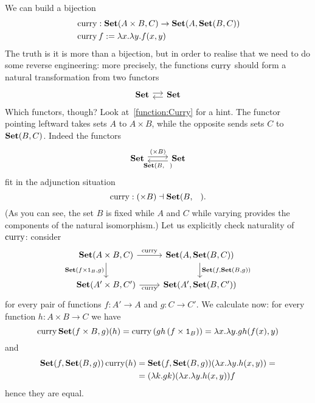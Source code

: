 \begin{example}\label{example:CurryingFunctions}
  We can build a bijection
  \begin{equation}\begin{aligned}
    & \operatorname{curry} : \mathbf{Set}(A \times B, C) \to \mathbf{Set}(A, \mathbf{Set}(B, C)) \\
    & \operatorname{curry} f := \lambda x. \lambda y. f(x, y)
  \end{aligned}\label{function:Curry}\end{equation}
The truth is it is more than a bijection, but in order to realise that
we need to do some reverse engineering: more precisely, the functions
\(\operatorname{curry}\) should form a natural transformation from two functors
\[\begin{tikzcd}[column sep=small] \Set \ar[r, shift left] & \Set
    \ar[l, shift left] \end{tikzcd}\] Which functors, though? Look
at~\eqref{function:Curry} for a hint. The functor pointing leftward
takes sets \(A\) to \(A \times B\), while the opposite sends sets
\(C\) to \(\mathbf{Set}(B, C)\). Indeed the functors
\[\begin{tikzcd}
    \Set \ar["{(\times B)}", r, shift left] & \Set \ar["{\Set(B, \hole)}",
    l, shift left]
  \end{tikzcd}\] fit in the adjunction situation
\[\curry : (\times B) \dashv \Set(B, \hole) .\]
(As you can see, the set \(B\) is fixed while \(A\) and \(C\) while
varying provides the components of the natural isomorphism.) Let us
explicitly check naturality of \(\operatorname{curry}\): consider
\[\begin{tikzcd}
    \Set(A \times B, C) \ar["{\Set(f \times \id_B, g)}", d, swap] \ar["\curry", r] & \Set(A, \Set(B, C)) \ar["{\Set(f, \Set(B, g))}", d] \\
    \Set(A' \times B, C') \ar["\curry", r, swap] & \Set(A', \Set(B, C'))
  \end{tikzcd}\] for every pair of functions \(f : A' \to A\) and
\(g : C \to C'\). We calculate now: for every function
\(h : A \times B \to C\) we have
\[\operatorname{curry} \mathbf{Set}(f \times B, g) (h) = \operatorname{curry} \left(g h \left(f \times
      \mathtt 1_B\right)\right) = \lambda x. \lambda y. gh(f(x), y) \] and
\[\begin{aligned}
  \mathbf{Set}(f, \mathbf{Set}(B, g)) \operatorname{curry} (h) &= \mathbf{Set}(f, \mathbf{Set}(B, g)) (\lambda x. \lambda y. h(x, y)) = \\
                                 &= (\lambda k. gk) (\lambda x. \lambda y. h(x, y)) f
\end{aligned}\]
hence they are equal. 
\end{example}

